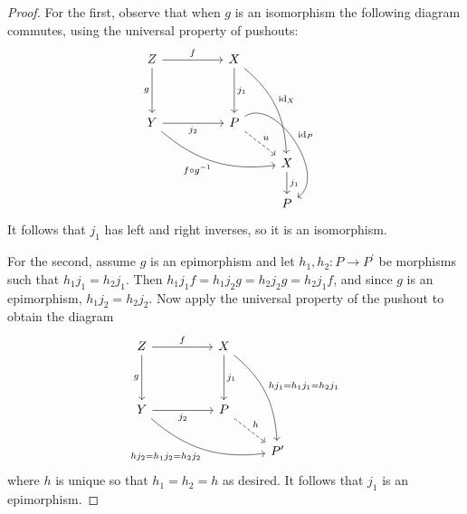 \documentclass[11pt]{article}
\DeclareMathOperator{\id}{id}
\begin{document}
\begin{enumerate}
\begin{proof}
    For the first, observe that when $g$ is an isomorphism the following diagram commutes, using the universal property of pushouts:
\[\begin{tikzcd}
	Z && X \\
	\\
	Y && P \\
	&&& X \\
	&&& P
	\arrow["f", from=1-1, to=1-3]
	\arrow["g"', from=1-1, to=3-1]
	\arrow["{j_2}"', from=3-1, to=3-3]
	\arrow["{j_1}", from=1-3, to=3-3]
	\arrow["u", dashed, from=3-3, to=4-4]
	\arrow["{f\circ g^{-1}}"', bend right=24, from=3-1, to=4-4]
	\arrow["{j_1}", from=4-4, to=5-4]
	\arrow["{\id_X}", bend left=24, from=1-3, to=4-4]
	\arrow["{\id_P}", bend left=90, from=3-3, to=5-4]
\end{tikzcd}\] It follows that $j_1$ has left and right inverses, so it is an isomorphism.

For the second, assume $g$ is an epimorphism and let $h_1,h_2\colon P\to P^\prime$ be morphisms such that $h_1j_1 = h_2j_1$. Then $h_1j_1f = h_1j_2g = h_2j_2g = h_2j_1f$, and since $g$ is an epimorphism, $h_1j_2 = h_2j_2$. Now apply the universal property of the pushout to obtain the diagram %
\[\begin{tikzcd}
	Z && X \\
	\\
	Y && P \\
	&&& {P^\prime}
	\arrow["f", from=1-1, to=1-3]
	\arrow["g"', from=1-1, to=3-1]
	\arrow["{j_2}"', from=3-1, to=3-3]
	\arrow["{j_1}", from=1-3, to=3-3]
	\arrow["h", dashed, from=3-3, to=4-4]
	\arrow["{hj_1 = h_1j_1 = h_2j_1}", bend left=24, from=1-3, to=4-4]
	\arrow["{hj_2 = h_1j_2 = h_2j_2}"', bend right=24, from=3-1, to=4-4]
\end{tikzcd}\] where $h$ is unique so that $h_1 = h_2 = h$ as desired. It follows that $j_1$ is an epimorphism.


\end{proof}
\end{enumerate}
\end{document}
